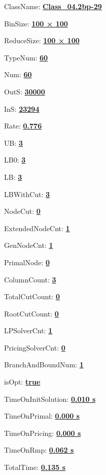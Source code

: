 \documentclass[11pt]{article}
\begin{document}
\pagestyle{empty}


ClassName: \underline{\textbf{Class_04.2bp-29}}
\par
BinSize: \underline{\textbf{100 × 100}}
\par
ReduceSize: \underline{\textbf{100 × 100}}
\par
TypeNum: \underline{\textbf{60}}
\par
Num: \underline{\textbf{60}}
\par
OutS: \underline{\textbf{30000}}
\par
InS: \underline{\textbf{23294}}
\par
Rate: \underline{\textbf{0.776}}
\par
UB: \underline{\textbf{3}}
\par
LB0: \underline{\textbf{3}}
\par
LB: \underline{\textbf{3}}
\par
LBWithCut: \underline{\textbf{3}}
\par
NodeCut: \underline{\textbf{0}}
\par
ExtendedNodeCnt: \underline{\textbf{1}}
\par
GenNodeCnt: \underline{\textbf{1}}
\par
PrimalNode: \underline{\textbf{0}}
\par
ColumnCount: \underline{\textbf{3}}
\par
TotalCutCount: \underline{\textbf{0}}
\par
RootCutCount: \underline{\textbf{0}}
\par
LPSolverCnt: \underline{\textbf{1}}
\par
PricingSolverCnt: \underline{\textbf{0}}
\par
BranchAndBoundNum: \underline{\textbf{1}}
\par
isOpt: \underline{\textbf{true}}
\par
TimeOnInitSolution: \underline{\textbf{0.010 s}}
\par
TimeOnPrimal: \underline{\textbf{0.000 s}}
\par
TimeOnPricing: \underline{\textbf{0.000 s}}
\par
TimeOnRmp: \underline{\textbf{0.062 s}}
\par
TotalTime: \underline{\textbf{0.135 s}}
\par
\newpage
\end{document}
